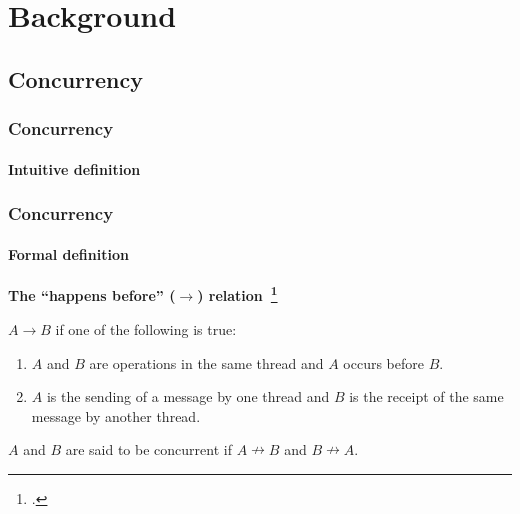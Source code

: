 \documentclass{beamer}
\begin{document}
  \section{Background}

  \subsection{Concurrency}

  \begin{frame}
    \frametitle{Concurrency}
    \framesubtitle{Intuitive definition}


  \end{frame}

  \begin{frame}
    \frametitle{Concurrency}
    \framesubtitle{Formal definition}

    \textbf{The ``happens before'' ($\rightarrow$) relation~\footcite{Lamport1977}}

    $A \rightarrow B$ if one of the following is true:

    \begin{enumerate}
      \item $A$ and $B$ are operations in the same thread and $A$ occurs before $B$.
      \item $A$ is the sending of a message by one thread and $B$ is the receipt of the same message by another thread.
    \end{enumerate}

    $A$ and $B$ are said to be concurrent if $A \nrightarrow B$ and $B \nrightarrow A$.
  \end{frame}
\end{document}
